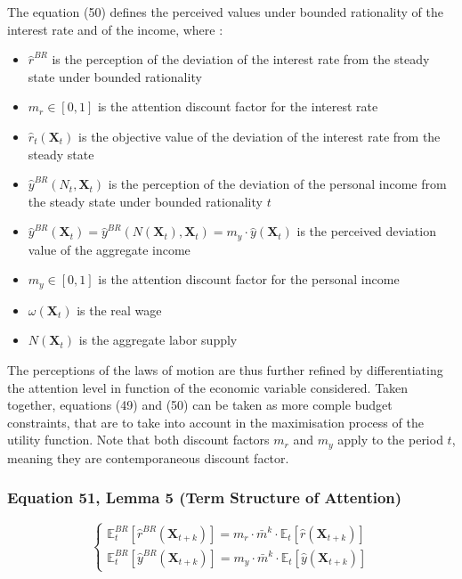 \documentclass{article}
\begin{document}
The equation (50) defines the perceived values under bounded rationality of the interest rate and of the income, where : 
\begin{itemize}
    \item $\hat{r}^{BR}$ is the perception of the deviation of the interest rate from the steady state under bounded rationality
    \item $m_{r}\in\left[0,1\right]$ is the attention discount factor for the interest rate
    \item $\hat{r}_{t}(\textbf{X}_{t})$ is the objective value of the deviation of the interest rate from the steady state 
    
    \item $\hat{y}^{BR}(N_{t},\textbf{X}_{t})$ is the perception of the deviation of the personal income from the steady state under bounded rationality $t$
    \item $\hat{y}^{BR}(\textbf{X}_{t})=\hat{y}^{BR}(N(\textbf{X}_{t}),\textbf{X}_{t})=m_{y}\cdot\hat{y}(\textbf{X}_{t})$ is the perceived deviation value of the aggregate income
    \item $m_{y}\in\left[0,1\right]$ is the attention discount factor for the personal income
    \item $\omega(\textbf{X}_{t})$ is the real wage
    \item $N(\textbf{X}_{t})$ is the aggregate labor supply
\end{itemize}
The perceptions of the laws of motion are thus further refined by differentiating the attention level in function of the economic variable considered. 
Taken together, equations (49) and (50) can be taken as more comple budget constraints, that are to take into account in the maximisation process of the utility function.
Note that both discount factors $m_{r}$ and $m_{y}$ apply to the period $t$, meaning they are contemporaneous discount factor. 

\subsubsection*{Equation 51, Lemma 5 (Term Structure of Attention)}

\begin{equation}\tag{51}
    \begin{cases}
        \mathbb{E}_{t}^{BR}\left[\hat{r}^{BR}(\textbf{X}_{t+k})\right]=m_{r}\cdot\bar{m}^{k}\cdot\mathbb{E}_{t}\left[\hat{r}(\textbf{X}_{t+k})\right] \\
        \mathbb{E}_{t}^{BR}\left[\hat{y}^{BR}(\textbf{X}_{t+k})\right]=m_{y}\cdot\bar{m}^{k}\cdot\mathbb{E}_{t}\left[\hat{y}(\textbf{X}_{t+k})\right]
    \end{cases}
\end{equation}
\end{document}

